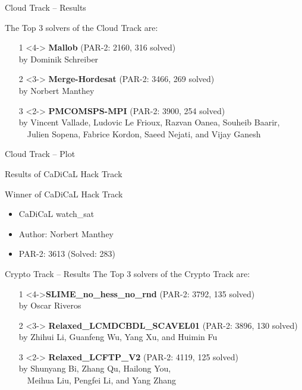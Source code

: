 \documentclass{beamer}
\begin{document}

\begin{frame}{Cloud Track -- Results}

The Top 3 solvers of the Cloud Track are:
\begin{itemize}

\item[1]<4-> {\bf Mallob} (PAR-2: 2160, 316 solved)\\
by Dominik Schreiber
\item[2]<3-> {\bf Merge-Hordesat} (PAR-2: 3466, 269 solved)\\
by Norbert Manthey
\item[3]<2-> {\bf PMCOMSPS-MPI} (PAR-2: 3900, 254 solved)\\
by Vincent Vallade, Ludovic Le Frioux, Razvan Oanea, Souheib Baarir, \\~~Julien Sopena, Fabrice Kordon, Saeed Nejati, and Vijay Ganesh
\end{itemize}
\end{frame}


\begin{frame}{Cloud Track -- Plot}
\centering
\resizebox{.9\textwidth}{!}{%

}
\end{frame}


\begin{frame}{Results of CaDiCaL Hack Track}
\begin{block}{Winner of CaDiCaL Hack Track}
\begin{itemize}
\item<2> CaDiCaL watch\_sat 
\item<2> Author: Norbert Manthey
\item<2> PAR-2: 3613 (Solved: 283)
\end{itemize}
\end{block}
\end{frame}


\begin{frame}{Crypto Track -- Results}
The Top 3 solvers of the Crypto Track are:
\begin{itemize}
\item[1]<4->{\bf SLIME\_no\_hess\_no\_rnd} (PAR-2: 3792, 135 solved)\\
by Oscar Riveros
\item[2]<3-> {\bf Relaxed\_LCMDCBDL\_SCAVEL01} (PAR-2: 3896, 130 solved)\\
by Zhihui Li, Guanfeng Wu, Yang Xu, and Huimin Fu
\item[3]<2-> {\bf Relaxed\_LCFTP\_V2} (PAR-2: 4119, 125 solved)\\
by Shunyang Bi, Zhang Qu, Hailong You, \\~~Meihua Liu, Pengfei Li, and Yang Zhang
\end{itemize}

\end{frame}
\end{document}
